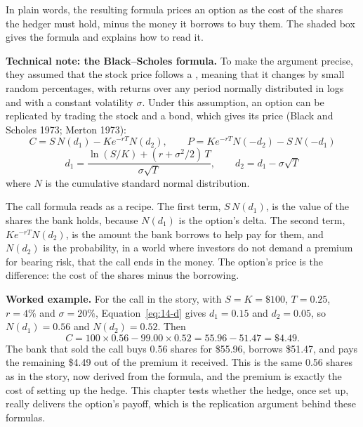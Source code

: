 In plain words, the resulting formula prices an option as the cost of the shares the hedger must hold, minus the money it borrows to buy them. The shaded box gives the formula and explains how to read it.

\begin{technote}
\textbf{Technical note: the Black--Scholes formula.} To make the argument precise, they assumed that the stock price follows a , meaning that it changes by small random percentages, with returns over any period normally distributed in logs and with a constant volatility $\sigma$. Under this assumption, an option can be replicated by trading the stock and a bond, which gives its price (Black and Scholes 1973; Merton 1973):
\begin{equation}
  C = S\,N(d_1) - K e^{-rT} N(d_2), \qquad P = K e^{-rT} N(-d_2) - S\,N(-d_1)
  \label{eq:14-bs}
\end{equation}
\begin{equation}
  d_1 = \frac{\ln(S/K) + (r + \sigma^2/2)\,T}{\sigma\sqrt{T}}, \qquad d_2 = d_1 - \sigma\sqrt{T}
  \label{eq:14-d}
\end{equation}
where $N$ is the cumulative standard normal distribution.

The call formula reads as a recipe. The first term, $S\,N(d_1)$, is the value of the shares the bank holds, because $N(d_1)$ is the option's delta. The second term, $K e^{-rT} N(d_2)$, is the amount the bank borrows to help pay for them, and $N(d_2)$ is the probability, in a world where investors do not demand a premium for bearing risk, that the call ends in the money. The option's price is the difference: the cost of the shares minus the borrowing.
\end{technote}

\textbf{Worked example.} For the call in the story, with $S = K = \$100$, $T = 0.25$, $r = 4\%$ and $\sigma = 20\%$, Equation~\eqref{eq:14-d} gives $d_1 = 0.15$ and $d_2 = 0.05$, so $N(d_1) = 0.56$ and $N(d_2) = 0.52$. Then
\begin{equation}
  C = 100 \times 0.56 - 99.00 \times 0.52 = 55.96 - 51.47 = \$4.49.
  \label{eq:14-bs-example}
\end{equation}
The bank that sold the call buys 0.56 shares for \$55.96, borrows \$51.47, and pays the remaining \$4.49 out of the premium it received. This is the same 0.56 shares as in the story, now derived from the formula, and the premium is exactly the cost of setting up the hedge. This chapter tests whether the hedge, once set up, really delivers the option's payoff, which is the replication argument behind these formulas.

